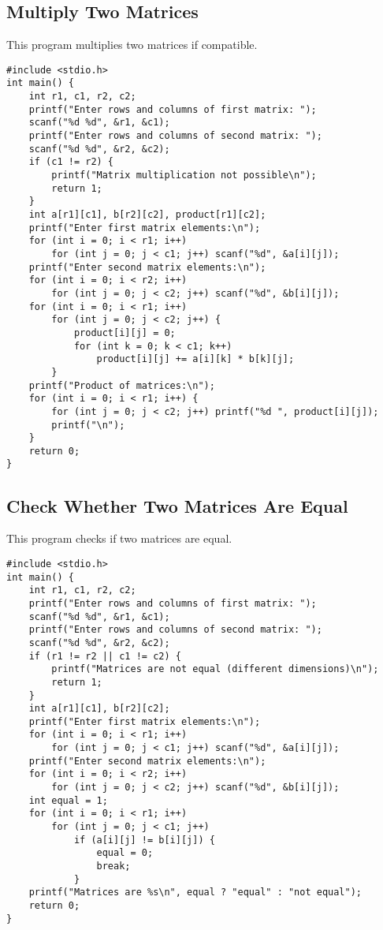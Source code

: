 \documentclass[a4paper,12pt]{article}
\begin{document}
\subsection{Multiply Two Matrices}
This program multiplies two matrices if compatible.
\begin{lstlisting}[caption={Multiply Two Matrices}]
#include <stdio.h>
int main() {
    int r1, c1, r2, c2;
    printf("Enter rows and columns of first matrix: ");
    scanf("%d %d", &r1, &c1);
    printf("Enter rows and columns of second matrix: ");
    scanf("%d %d", &r2, &c2);
    if (c1 != r2) {
        printf("Matrix multiplication not possible\n");
        return 1;
    }
    int a[r1][c1], b[r2][c2], product[r1][c2];
    printf("Enter first matrix elements:\n");
    for (int i = 0; i < r1; i++)
        for (int j = 0; j < c1; j++) scanf("%d", &a[i][j]);
    printf("Enter second matrix elements:\n");
    for (int i = 0; i < r2; i++)
        for (int j = 0; j < c2; j++) scanf("%d", &b[i][j]);
    for (int i = 0; i < r1; i++)
        for (int j = 0; j < c2; j++) {
            product[i][j] = 0;
            for (int k = 0; k < c1; k++)
                product[i][j] += a[i][k] * b[k][j];
        }
    printf("Product of matrices:\n");
    for (int i = 0; i < r1; i++) {
        for (int j = 0; j < c2; j++) printf("%d ", product[i][j]);
        printf("\n");
    }
    return 0;
}
\end{lstlisting}
\clearpage

\subsection{Check Whether Two Matrices Are Equal}
This program checks if two matrices are equal.
\begin{lstlisting}[caption={Check Whether Two Matrices Are Equal}]
#include <stdio.h>
int main() {
    int r1, c1, r2, c2;
    printf("Enter rows and columns of first matrix: ");
    scanf("%d %d", &r1, &c1);
    printf("Enter rows and columns of second matrix: ");
    scanf("%d %d", &r2, &c2);
    if (r1 != r2 || c1 != c2) {
        printf("Matrices are not equal (different dimensions)\n");
        return 1;
    }
    int a[r1][c1], b[r2][c2];
    printf("Enter first matrix elements:\n");
    for (int i = 0; i < r1; i++)
        for (int j = 0; j < c1; j++) scanf("%d", &a[i][j]);
    printf("Enter second matrix elements:\n");
    for (int i = 0; i < r2; i++)
        for (int j = 0; j < c2; j++) scanf("%d", &b[i][j]);
    int equal = 1;
    for (int i = 0; i < r1; i++)
        for (int j = 0; j < c1; j++)
            if (a[i][j] != b[i][j]) {
                equal = 0;
                break;
            }
    printf("Matrices are %s\n", equal ? "equal" : "not equal");
    return 0;
}
\end{lstlisting}
\clearpage
\end{document}
